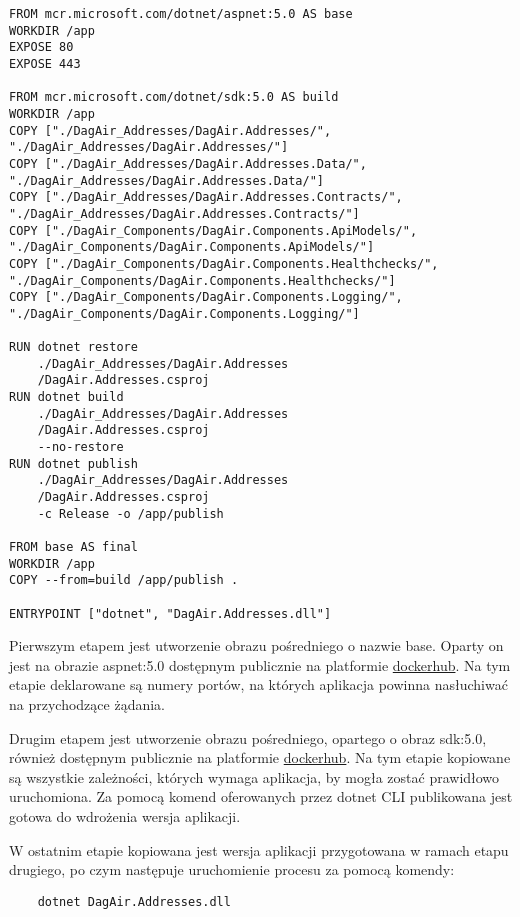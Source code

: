 \begin{lstlisting}
FROM mcr.microsoft.com/dotnet/aspnet:5.0 AS base
WORKDIR /app
EXPOSE 80
EXPOSE 443

FROM mcr.microsoft.com/dotnet/sdk:5.0 AS build
WORKDIR /app
COPY ["./DagAir_Addresses/DagAir.Addresses/", 
"./DagAir_Addresses/DagAir.Addresses/"]
COPY ["./DagAir_Addresses/DagAir.Addresses.Data/", 
"./DagAir_Addresses/DagAir.Addresses.Data/"]
COPY ["./DagAir_Addresses/DagAir.Addresses.Contracts/", 
"./DagAir_Addresses/DagAir.Addresses.Contracts/"]
COPY ["./DagAir_Components/DagAir.Components.ApiModels/", 
"./DagAir_Components/DagAir.Components.ApiModels/"]
COPY ["./DagAir_Components/DagAir.Components.Healthchecks/", 
"./DagAir_Components/DagAir.Components.Healthchecks/"]
COPY ["./DagAir_Components/DagAir.Components.Logging/", 
"./DagAir_Components/DagAir.Components.Logging/"]

RUN dotnet restore 
    ./DagAir_Addresses/DagAir.Addresses
    /DagAir.Addresses.csproj
RUN dotnet build 
    ./DagAir_Addresses/DagAir.Addresses
    /DagAir.Addresses.csproj 
    --no-restore
RUN dotnet publish 
    ./DagAir_Addresses/DagAir.Addresses
    /DagAir.Addresses.csproj 
    -c Release -o /app/publish

FROM base AS final
WORKDIR /app
COPY --from=build /app/publish .

ENTRYPOINT ["dotnet", "DagAir.Addresses.dll"]
\end{lstlisting}

Pierwszym etapem jest utworzenie obrazu pośredniego o nazwie base. Oparty on jest na obrazie 
aspnet:5.0 dostępnym publicznie na platformie 
\href{https://hub.docker.com/_/microsoft-dotnet-aspnet}{dockerhub}. Na tym etapie deklarowane są
numery portów, na których aplikacja powinna nasłuchiwać na przychodzące żądania.

Drugim etapem jest utworzenie obrazu pośredniego, opartego o obraz sdk:5.0, również dostępnym publicznie
na platformie \href{https://hub.docker.com/_/microsoft-dotnet-sdk}{dockerhub}. Na tym etapie kopiowane
są wszystkie zależności, których wymaga aplikacja, by mogła zostać prawidłowo uruchomiona.
Za pomocą komend oferowanych przez dotnet CLI publikowana jest gotowa do wdrożenia wersja aplikacji.

W ostatnim etapie kopiowana jest wersja aplikacji przygotowana w ramach etapu drugiego, po czym
następuje uruchomienie procesu za pomocą komendy:

\begin{lstlisting}
    dotnet DagAir.Addresses.dll
\end{lstlisting}

